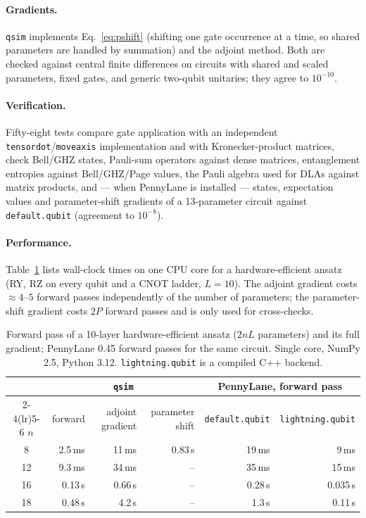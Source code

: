 \documentclass[11pt]{article}
\begin{document}
\paragraph{Gradients.}
\texttt{qsim} implements Eq.~\eqref{eq:pshift} (shifting one gate occurrence at a time, so shared parameters are handled by summation) and the adjoint method. Both are checked against central finite differences on circuits with shared and scaled parameters, fixed gates, and generic two-qubit unitaries; they agree to $10^{-10}$.

\paragraph{Verification.}
Fifty-eight tests compare gate application with an independent \texttt{tensordot}/\allowbreak\texttt{moveaxis} implementation and with Kronecker-product matrices, check Bell/GHZ states, Pauli-sum operators against dense matrices, entanglement entropies against Bell/GHZ/Page values, the Pauli algebra used for DLAs against matrix products, and --- when PennyLane is installed --- states, expectation values and parameter-shift gradients of a 13-parameter circuit against \texttt{default.qubit} (agreement to $10^{-8}$).

\paragraph{Performance.}
Table~\ref{tab:bench} lists wall-clock times on one CPU core for a hardware-efficient ansatz (RY, RZ on every qubit and a CNOT ladder, $L=10$). The adjoint gradient costs $\approx 4$--$5$ forward passes independently of the number of parameters; the parameter-shift gradient costs $2P$ forward passes and is only used for cross-checks.

\begin{table}[t]
\centering\small
\begin{tabular}{crrrrr}
\toprule
& \multicolumn{3}{c}{\texttt{qsim}} & \multicolumn{2}{c}{PennyLane, forward pass} \\
\cmidrule(lr){2-4}\cmidrule(lr){5-6}
$n$ & forward & adjoint gradient & parameter shift & \texttt{default.qubit} & \texttt{lightning.qubit} \\
\midrule
8  & 2.5\,ms & 11\,ms & 0.83\,s & 19\,ms & 9\,ms \\
12 & 9.3\,ms & 34\,ms & --     & 35\,ms & 15\,ms \\
16 & 0.13\,s & 0.66\,s & --    & 0.28\,s & 0.035\,s \\
18 & 0.48\,s & 4.2\,s & --     & 1.3\,s  & 0.11\,s \\
\bottomrule
\end{tabular}
\caption{Forward pass of a 10-layer hardware-efficient ansatz ($2nL$ parameters) and its full gradient; PennyLane 0.45 forward passes for the same circuit. Single core, NumPy 2.5, Python 3.12. \texttt{lightning.qubit} is a compiled C++ backend.}
\label{tab:bench}
\end{table}
\end{document}
